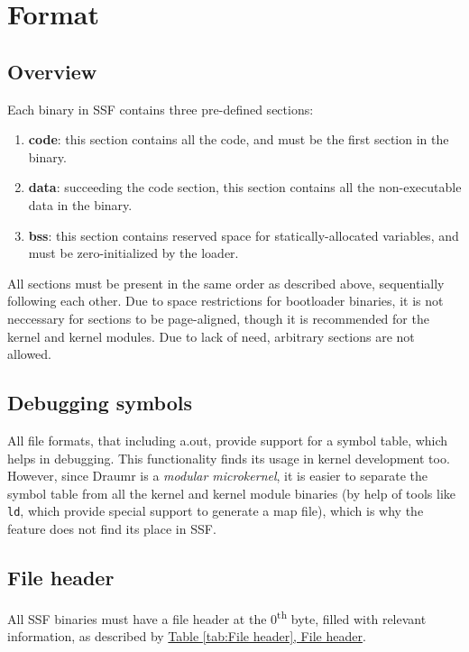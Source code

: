 \documentclass[a4paper,oneside]{memoir}
\begin{document}
\chapter{Format}

\section{Overview}

Each binary in SSF contains three pre-defined sections:

\begin{enumerate}
\item \textbf{code}: this section contains all the code, and must be the first section in the binary.
\item \textbf{data}: succeeding the code section, this section contains all the non-executable data in the binary.
\item \textbf{bss}: this section contains reserved space for statically-allocated variables, and must be zero-initialized by the loader. 
\end{enumerate}

All sections must be present in the same order as described above, sequentially following each other. Due to space restrictions for bootloader binaries, it is not neccessary for sections to be page-aligned, though it is recommended for the kernel and kernel modules. Due to lack of need, arbitrary sections are not allowed.

\section{Debugging symbols}

All file formats, that including a.out, provide support for a symbol table, which helps in debugging. This functionality finds its usage in kernel development too. However, since Draumr is a \emph{modular microkernel}, it is easier to separate the symbol table from all the kernel and kernel module binaries (by help of tools like \texttt{ld}, which provide special support to generate a map file), which is why the feature does not find its place in SSF.

\section{File header}

All SSF binaries must have a file header at the 0\textsuperscript{th} byte, filled with relevant information, as described by \hyperref[tab:File header]{Table \ref*{tab:File header}, File header}.
\end{document}
